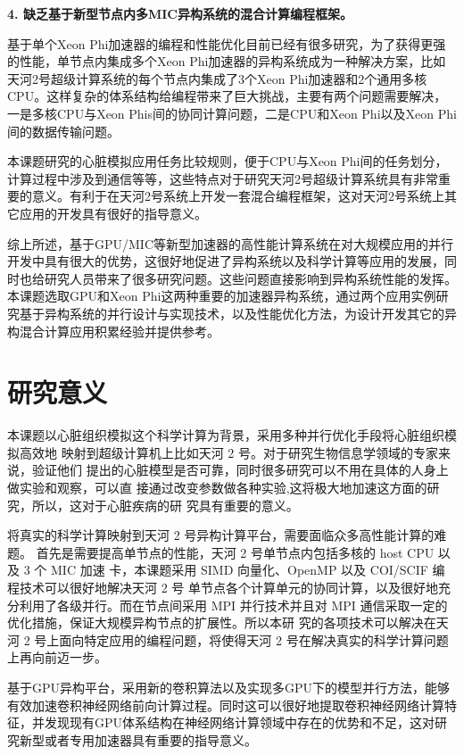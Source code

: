   \textbf{4.  缺乏基于新型节点内多MIC异构系统的混合计算编程框架。}
   
基于单个Xeon Phi加速器的编程和性能优化目前已经有很多研究，为了获得更强的性能，单节点内集成多个Xeon Phi加速器的异构系统成为一种解决方案，比如天河2号超级计算系统的每个节点内集成了3个Xeon Phi加速器和2个通用多核CPU。这样复杂的体系结构给编程带来了巨大挑战，主要有两个问题需要解决，一是多核CPU与Xeon Phis间的协同计算问题，二是CPU和Xeon Phi以及Xeon Phi间的数据传输问题。
 
本课题研究的心脏模拟应用任务比较规则，便于CPU与Xeon Phi间的任务划分，计算过程中涉及到通信等等，这些特点对于研究天河2号超级计算系统具有非常重要的意义。有利于在天河2号系统上开发一套混合编程框架，这对天河2号系统上其它应用的开发具有很好的指导意义。
 
 综上所述，基于GPU/MIC等新型加速器的高性能计算系统在对大规模应用的并行开发中具有很大的优势，这很好地促进了异构系统以及科学计算等应用的发展，同时也给研究人员带来了很多研究问题。这些问题直接影响到异构系统性能的发挥。本课题选取GPU和Xeon Phi这两种重要的加速器异构系统，通过两个应用实例研究基于异构系统的并行设计与实现技术，以及性能优化方法，为设计开发其它的异构混合计算应用积累经验并提供参考。


\section{研究意义}
本课题以心脏组织模拟这个科学计算为背景，采用多种并行优化手段将心脏组织模拟高效地 映射到超级计算机上比如天河 2 号。对于研究生物信息学领域的专家来说，验证他们 提出的心脏模型是否可靠，同时很多研究可以不用在具体的人身上做实验和观察，可以直 接通过改变参数做各种实验,这将极大地加速这方面的研究，所以，这对于心脏疾病的研 究具有重要的意义。

将真实的科学计算映射到天河 2 号异构计算平台，需要面临众多高性能计算的难题。 首先是需要提高单节点的性能，天河 2 号单节点内包括多核的 host CPU 以及 3 个 MIC 加速 卡，本课题采用 SIMD 向量化、OpenMP 以及 COI/SCIF 编程技术可以很好地解决天河 2 号 单节点各个计算单元的协同计算，以及很好地充分利用了各级并行。而在节点间采用 MPI 并行技术并且对 MPI 通信采取一定的优化措施，保证大规模异构节点的扩展性。所以本研 究的各项技术可以解决在天河 2 号上面向特定应用的编程问题，将使得天河 2 号在解决真实的科学计算问题上再向前迈一步。

基于GPU异构平台，采用新的卷积算法以及实现多GPU下的模型并行方法，能够有效加速卷积神经网络前向计算过程。同时这可以很好地提取卷积神经网络计算特征，并发现现有GPU体系结构在神经网络计算领域中存在的优势和不足，这对研究新型或者专用加速器具有重要的指导意义。

